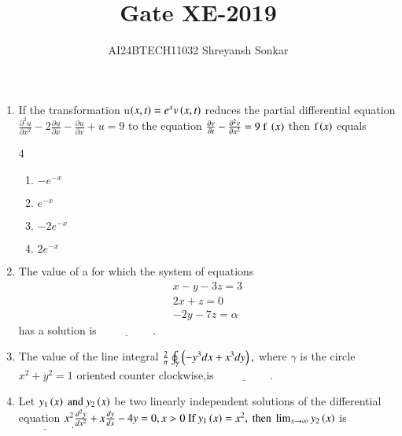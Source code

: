 \documentclass[journal]{IEEEtran}
\begin{document}

\vspace{3cm}


\renewcommand{\thefigure}{\theenumi}
\renewcommand{\thetable}{\theenumi}
\setlength{\intextsep}{10pt} %


\renewcommand{\thetable}{\theenumi}

\title{Gate XE-2019}
\author{AI24BTECH11032 Shreyansh Sonkar
}
\maketitle
\renewcommand{\thefigure}{\theenumi}
\renewcommand{\thetable}{\theenumi}
\begin{enumerate} [start=14]
\item If the transformation u$\left(x,t\right)=e^{x}v\left(x,t\right)$ reduces the partial differential equation $\frac{\partial^{2}u}{\partial x^{2}}-2\frac{\partial u}{\partial x}-\frac{\partial u}{\partial x}+u=9$  to the equation $\frac{\partial v}{\partial t}-\frac{\partial^{2}v}{\partial x^{2}}=9 \text{ f }\left(x\right)$ then $\text{f}\left(x\right)$ equals 
\begin{multicols} {4}
    \begin{enumerate}
        \item $-e^{-x}$
        \item $e^{-x}$
        \item $-2e^{-x}$
        \item $2e^{-x}$
    \end{enumerate}
\end{multicols}
\bigskip
\item The value of a for which the system of equations 
\begin{align*}
    x-y-3z=3\\
    2x+z=0\\
    -2y-7z=\alpha
\end{align*}
has a solution is $\underline{\hspace{2cm}}.$
\bigskip
\item The value of the line integral $\frac{2}{\pi}\oint_{\gamma}\left(-y^{3}dx+x^{3}dy\right),$ where $\gamma$ is the circle $x^{2}+y^{2}=1$ oriented counter clockwise,is $\underline{\hspace{2cm}}.$
\bigskip
\item Let $y_{1}\left(x\right)\text{ and } y_{2}\left(x\right)$  be two linearly independent solutions of the differential equation $x^{2}\frac{d^{2}y}{dx^{2}}+x\frac{dy}{dx}-4y=0,x>0\text{ If } y_{1}\left(x\right)=x^{2},\text{ then }\lim_{x\to\infty}y_{2}\left(x\right)$ is $\underline{\hspace{2cm}}.$

\end{enumerate}
\end{document}
